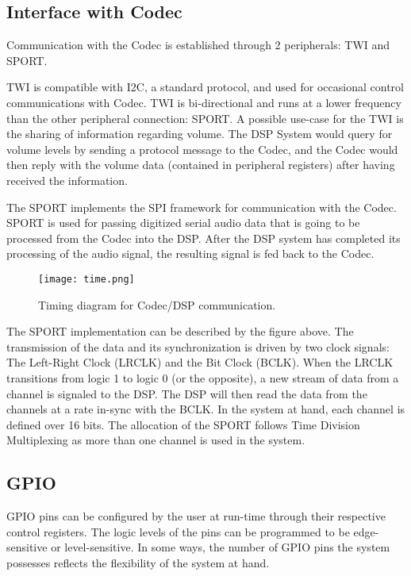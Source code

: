 \subsection{Interface with Codec}
Communication with the Codec is established through 2 peripherals: TWI and SPORT.

TWI is compatible with I2C, a standard protocol, and used for occasional control communications with Codec. TWI is bi-directional and runs at a lower frequency than the other peripheral connection: SPORT. 
A possible use-case for the TWI is the sharing of information regarding volume. The DSP System would query for volume levels by sending a protocol message to the Codec, and the Codec would then reply with the volume data (contained in peripheral registers) after having received the information.

The SPORT implements the SPI framework for communication with the Codec. SPORT is used for passing digitized serial audio data that is going to be processed from the Codec into the DSP. After the DSP system has completed its processing of the audio signal, the resulting signal is fed back to the Codec. 


\begin{figure}[h!]
	\centering
	\texttt{[image: time.png]}
	\caption{Timing diagram for Codec/DSP communication.}
	\label{fig:timing}
	
\end{figure}

The SPORT implementation can be described by the figure above. The transmission of the data and its synchronization is driven by two clock signals: The Left-Right Clock (LRCLK) and the Bit Clock (BCLK). When the LRCLK transitions from logic 1 to logic 0 (or the opposite), a new stream of data from a channel is signaled to the DSP. The DSP will then read the data from the channels at a rate in-sync with the BCLK. In the system at hand, each channel is defined over 16 bits. The allocation of the SPORT follows Time Division Multiplexing as more than one channel is used in the system. 


\subsection{GPIO}
GPIO pins can be configured by the user at run-time through their respective control registers. The logic levels of the pins can be programmed to be edge-sensitive or level-sensitive. In some ways, the number of GPIO pins the system possesses reflects the flexibility of the system at hand. 


